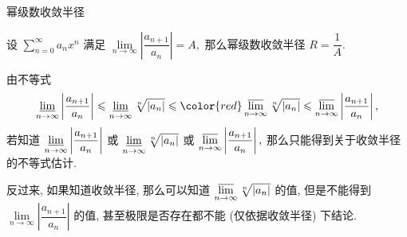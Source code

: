 
\begin{frame}{幂级数收敛半径}

\begin{thm}
设 $\sum\limits_{n=0}^\infty a_n x^n$ 满足 $\lim\limits_{n\to\infty} \left\lvert \dfrac{a_{n+1}}{a_n} \right\rvert = A,$ 那么幂级数收敛半径 $R = \dfrac{1}{A}.$
\end{thm}

\pause

\begin{attnblock}
由不等式
\vspace{-0.5em}
\[\varliminf\limits_{n\to\infty} \left\lvert \dfrac{a_{n+1}}{a_n} \right\rvert \leqslant \varliminf\limits_{n\to\infty} \sqrt[n]{\left\lvert a_n \right\rvert} \leqslant {\color{red}\varlimsup\limits_{n\to\infty} \sqrt[n]{\left\lvert a_n \right\rvert}} \leqslant \varlimsup\limits_{n\to\infty} \left\lvert \dfrac{a_{n+1}}{a_n} \right\rvert,\]
若知道 $\varliminf\limits_{n\to\infty} \left\lvert \dfrac{a_{n+1}}{a_n} \right\rvert$ 或 $\varliminf\limits_{n\to\infty} \sqrt[n]{\left\lvert a_n \right\rvert}$ 或 $\varlimsup\limits_{n\to\infty} \left\lvert \dfrac{a_{n+1}}{a_n} \right\rvert,$ 那么只能得到关于收敛半径的不等式估计.

\pause

反过来, 如果知道收敛半径, 那么可以知道 $\varlimsup\limits_{n\to\infty} \sqrt[n]{\left\lvert a_n \right\rvert}$ 的值, 但是不能得到 $\lim\limits_{n\to\infty} \left\lvert \dfrac{a_{n+1}}{a_n} \right\rvert$ 的值, 甚至极限是否存在都不能 (仅依据收敛半径) 下结论.

\end{attnblock}

\end{frame}


